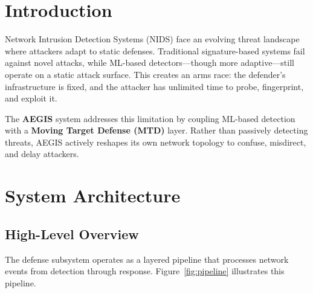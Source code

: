 \documentclass[12pt,a4paper]{report}
\begin{document}
\section{Introduction}

Network Intrusion Detection Systems (NIDS) face an evolving threat landscape where attackers adapt to static defenses. Traditional signature-based systems fail against novel attacks, while ML-based detectors---though more adaptive---still operate on a static attack surface. This creates an arms race: the defender's infrastructure is fixed, and the attacker has unlimited time to probe, fingerprint, and exploit it.

The \textbf{AEGIS} system addresses this limitation by coupling ML-based detection with a \textbf{Moving Target Defense (MTD)} layer. Rather than passively detecting threats, AEGIS actively reshapes its own network topology to confuse, misdirect, and delay attackers.

\section{System Architecture}

\subsection{High-Level Overview}

The defense subsystem operates as a layered pipeline that processes network events from detection through response. Figure~\ref{fig:pipeline} illustrates this pipeline.
\end{document}
